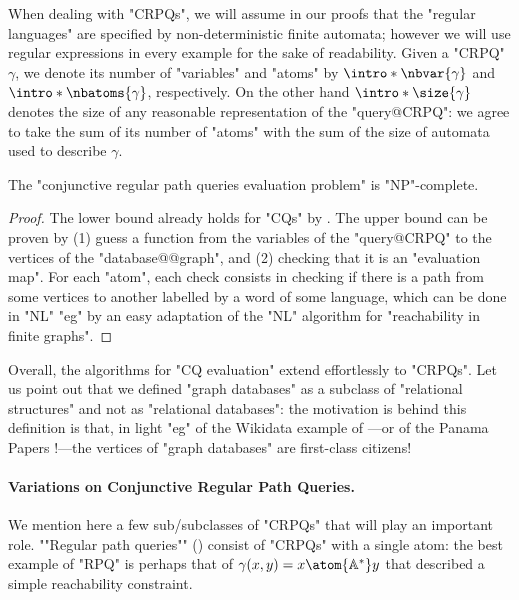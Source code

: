 
When dealing with "CRPQs", we will assume in our proofs that the "regular languages"
are specified by non-deterministic finite automata; however we will use
regular expressions in every example for the sake of readability.
Given a "CRPQ" $\gamma$, we denote its number of "variables"
and "atoms" by \AP$\intro*\nbvar{\gamma}$ and $\intro*\nbatoms{\gamma}$, respectively.
On the other hand $\intro*\size{\gamma}$ denotes the size of any reasonable representation
of the "query@CRPQ": we agree to take the sum of its number of "atoms" with
the sum of the size of automata used to describe $\gamma$.

\begin{proposition}
    The "conjunctive regular path queries evaluation problem" is "NP"-complete.
\end{proposition}

\begin{proof}
    The lower bound already holds for "CQs" by .
    The upper bound can be proven by (1) guess a function from the variables
    of the "query@CRPQ" to the vertices of the "database@@graph",
    and (2) checking that it is an "evaluation map". 
    For each "atom", each check consists in checking if there is a
    path from some vertices to another labelled by a word of some language,
    which can be done in "NL" "eg" by an easy
    adaptation of the "NL" algorithm for "reachability in finite graphs".
\end{proof}


Overall, the algorithms for "CQ evaluation" extend effortlessly to "CRPQs". 
Let us point out that we defined "graph databases" as a subclass of
"relational structures" and not as "relational databases":
the motivation is behind this definition is that,
in light "eg" of the Wikidata example of ---or  
of the Panama Papers \cite{Neo4jPanama}!---the vertices of "graph databases"
are first-class citizens!

\paragraph*{Variations on Conjunctive Regular Path Queries.}
We mention here a few sub/subclasses of "CRPQs" that will play an important role.
\AP""Regular path queries"" () consist of "CRPQs" with a single atom:
the best example of "RPQ" is perhaps that of $\gamma(x,y) = x \atom{\A^*} y$
that described a simple reachability constraint.

